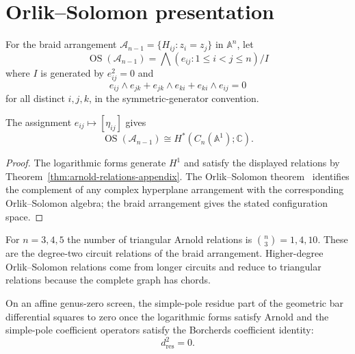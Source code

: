 \section{Orlik--Solomon presentation}
\label{sec:arnold-nine-term}

\begin{definition}\label{def:orlik-solomon-arnold}
For the braid arrangement
\(\mathcal{A}_{n-1}=\{H_{ij}:z_i=z_j\}\) in \(\mathbb{A}^n\), let
\[
\operatorname{OS}(\mathcal{A}_{n-1})
=
\bigwedge(e_{ij}:1\leq i<j\leq n)/I
\]
where \(I\) is generated by \(e_{ij}^2=0\) and
\[
e_{ij}\wedge e_{jk}
+e_{jk}\wedge e_{ki}
+e_{ki}\wedge e_{ij}=0
\]
for all distinct \(i,j,k\), in the symmetric-generator convention.
\end{definition}

\begin{lemma}\label{lem:OS-cohomology-arnold}
The assignment \(e_{ij}\mapsto[\eta_{ij}]\) gives
\[
\operatorname{OS}(\mathcal{A}_{n-1})
\cong
H^*(C_n(\mathbb{A}^1);\mathbb{C}).
\]
\end{lemma}

\begin{proof}
The logarithmic forms generate \(H^1\) and satisfy the displayed
relations by Theorem~\ref{thm:arnold-relations-appendix}. The
Orlik--Solomon theorem~\cite{OS80} identifies the complement of any
complex hyperplane arrangement with the corresponding
Orlik--Solomon algebra; the braid arrangement gives the stated
configuration space.
\end{proof}

\begin{remark}\label{rem:nine-term-detailed-arnold}
For \(n=3,4,5\) the number of triangular Arnold relations is
\(\binom{n}{3}=1,4,10\). These are the degree-two circuit relations of
the braid arrangement. Higher-degree Orlik--Solomon relations come
from longer circuits and reduce to triangular relations because the
complete graph has chords.
\end{remark}

\begin{corollary}\label{cor:bar-d-squared-zero-arnold}
On an affine genus-zero screen, the simple-pole residue part of the
geometric bar differential squares to zero once the logarithmic forms
satisfy Arnold and the simple-pole coefficient operators satisfy the
Borcherds coefficient identity:
\[
d_{\mathrm{res}}^2=0.
\]
\end{corollary}

